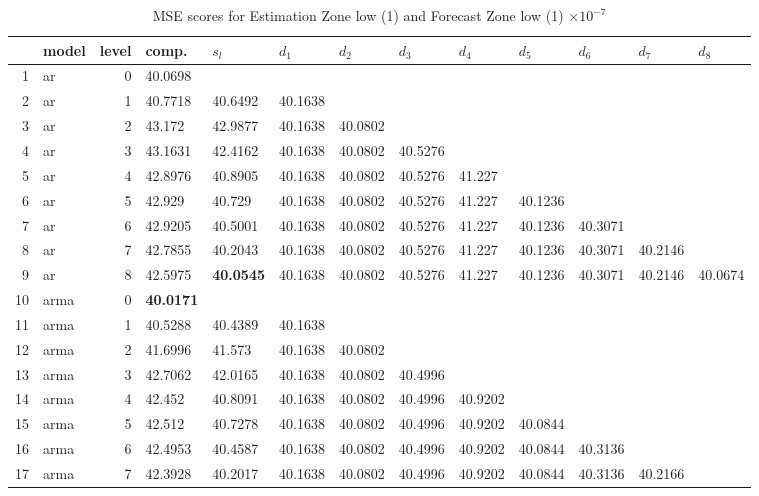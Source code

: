 \documentclass[10pt,a4paper]{article}
\begin{document}
\begin{table}[ht]
\centering
\caption{MSE scores for Estimation Zone low (1) and Forecast Zone low (1) $ \times 10^{-7}$} 
\begin{tabular}{rlrllllllllll}
  \hline
 & model & level & comp. & $s_l$ & $d_1$ & $d_2$ & $d_3$ & $d_4$ & $d_5$ & $d_6$ & $d_7$ & $d_8$ \\ 
  \hline
1 & ar &     0 & 40.0698 &  &  &  &  &  &  &  &  &  \\ 
  2 & ar &     1 & 40.7718 & 40.6492 & 40.1638 &  &  &  &  &  &  &  \\ 
  3 & ar &     2 & 43.172 & 42.9877 & 40.1638 & 40.0802 &  &  &  &  &  &  \\ 
  4 & ar &     3 & 43.1631 & 42.4162 & 40.1638 & 40.0802 & 40.5276 &  &  &  &  &  \\ 
  5 & ar &     4 & 42.8976 & 40.8905 & 40.1638 & 40.0802 & 40.5276 & 41.227 &  &  &  &  \\ 
  6 & ar &     5 & 42.929 & 40.729 & 40.1638 & 40.0802 & 40.5276 & 41.227 & 40.1236 &  &  &  \\ 
  7 & ar &     6 & 42.9205 & 40.5001 & 40.1638 & 40.0802 & 40.5276 & 41.227 & 40.1236 & 40.3071 &  &  \\ 
  8 & ar &     7 & 42.7855 & 40.2043 & 40.1638 & 40.0802 & 40.5276 & 41.227 & 40.1236 & 40.3071 & 40.2146 &  \\ 
  9 & ar &     8 & 42.5975 & \textbf{40.0545} & 40.1638 & 40.0802 & 40.5276 & 41.227 & 40.1236 & 40.3071 & 40.2146 & 40.0674 \\ 
   \hline
10 & arma &     0 & \textbf{40.0171} &  &  &  &  &  &  &  &  &  \\ 
  11 & arma &     1 & 40.5288 & 40.4389 & 40.1638 &  &  &  &  &  &  &  \\ 
  12 & arma &     2 & 41.6996 & 41.573 & 40.1638 & 40.0802 &  &  &  &  &  &  \\ 
  13 & arma &     3 & 42.7062 & 42.0165 & 40.1638 & 40.0802 & 40.4996 &  &  &  &  &  \\ 
  14 & arma &     4 & 42.452 & 40.8091 & 40.1638 & 40.0802 & 40.4996 & 40.9202 &  &  &  &  \\ 
  15 & arma &     5 & 42.512 & 40.7278 & 40.1638 & 40.0802 & 40.4996 & 40.9202 & 40.0844 &  &  &  \\ 
  16 & arma &     6 & 42.4953 & 40.4587 & 40.1638 & 40.0802 & 40.4996 & 40.9202 & 40.0844 & 40.3136 &  &  \\ 
  17 & arma &     7 & 42.3928 & 40.2017 & 40.1638 & 40.0802 & 40.4996 & 40.9202 & 40.0844 & 40.3136 & 40.2166 &  \\ 

\end{tabular}
\end{table}
\end{document}
